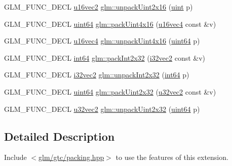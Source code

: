 \begin{DoxyCompactItemize}
\item 
G\+L\+M\+\_\+\+F\+U\+N\+C\+\_\+\+D\+E\+CL \hyperlink{group__gtc__type__precision_ga50bd2ceeb100a187e7c46f135269a0ec}{u16vec2} \hyperlink{group__gtc__packing_ga7778efa924e6efc386cb9f373bb06b72}{glm\+::unpack\+Uint2x16} (\hyperlink{group__core__precision_ga4fd29415871152bfb5abd588334147c8}{uint} p)
\item 
G\+L\+M\+\_\+\+F\+U\+N\+C\+\_\+\+D\+E\+CL \hyperlink{group__gtc__type__precision_gae3632bf9b37da66233d78930dd06378a}{uint64} \hyperlink{group__gtc__packing_ga19813cb34dd7102f9612ba6c0d9ef377}{glm\+::pack\+Uint4x16} (\hyperlink{group__gtc__type__precision_ga049d45ad8d0f78578d7ceb86a7fdaae4}{u16vec4} const \&v)
\item 
G\+L\+M\+\_\+\+F\+U\+N\+C\+\_\+\+D\+E\+CL \hyperlink{group__gtc__type__precision_ga049d45ad8d0f78578d7ceb86a7fdaae4}{u16vec4} \hyperlink{group__gtc__packing_gaf1eea82404af955004aae19a2dcb55f1}{glm\+::unpack\+Uint4x16} (\hyperlink{group__gtc__type__precision_gae3632bf9b37da66233d78930dd06378a}{uint64} p)
\item 
G\+L\+M\+\_\+\+F\+U\+N\+C\+\_\+\+D\+E\+CL \hyperlink{group__gtc__type__precision_ga435d75819cce297cc5fa21bd84ef89a5}{int64} \hyperlink{group__gtc__packing_ga1d6c24ff4f2b198eb2c4a2e4dcf7c336}{glm\+::pack\+Int2x32} (\hyperlink{group__gtc__type__precision_ga99191e0de942ecc1df32d522f8064789}{i32vec2} const \&v)
\item 
G\+L\+M\+\_\+\+F\+U\+N\+C\+\_\+\+D\+E\+CL \hyperlink{group__gtc__type__precision_ga99191e0de942ecc1df32d522f8064789}{i32vec2} \hyperlink{group__gtc__packing_ga6410b50fa48d15e70b2c34174ee4a3fc}{glm\+::unpack\+Int2x32} (\hyperlink{group__gtc__type__precision_ga435d75819cce297cc5fa21bd84ef89a5}{int64} p)
\item 
G\+L\+M\+\_\+\+F\+U\+N\+C\+\_\+\+D\+E\+CL \hyperlink{group__gtc__type__precision_gae3632bf9b37da66233d78930dd06378a}{uint64} \hyperlink{group__gtc__packing_ga4c4e4d6ab81a6b14cf066b40b6967c0a}{glm\+::pack\+Uint2x32} (\hyperlink{group__gtc__type__precision_gad854a1005ce84d8f6e8f05e42893f5c9}{u32vec2} const \&v)
\item 
G\+L\+M\+\_\+\+F\+U\+N\+C\+\_\+\+D\+E\+CL \hyperlink{group__gtc__type__precision_gad854a1005ce84d8f6e8f05e42893f5c9}{u32vec2} \hyperlink{group__gtc__packing_gab211ea5f8cf86f00efa4fd53cb302c82}{glm\+::unpack\+Uint2x32} (\hyperlink{group__gtc__type__precision_gae3632bf9b37da66233d78930dd06378a}{uint64} p)
\end{DoxyCompactItemize}


\subsection{Detailed Description}
Include $<$\hyperlink{gtc_2packing_8hpp}{glm/gtc/packing.\+hpp}$>$ to use the features of this extension.

